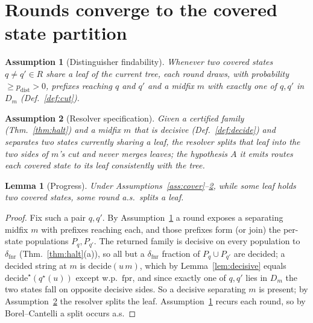 \documentclass[11pt]{article}
\newtheorem{lemma}{Lemma}
\newtheorem{assumption}{Assumption}
\newcommand{\fpr}{\mathrm{fpr}}
\newcommand{\fnr}{\mathrm{fnr}}
\begin{document}
\section{Rounds converge to the covered state partition}\label{sec:converge}

\begin{assumption}[Distinguisher findability]\label{ass:dist}
Whenever two covered states $q\ne q'\in R$ share a leaf of the current tree, each
round draws, with probability $\ge p_{\mathrm{dist}}>0$, prefixes reaching $q$ and
$q'$ and a midfix $m$ with exactly one of $q,q'$ in $D_m$ (Def.~\ref{def:cut}).
\end{assumption}

\begin{assumption}[Resolver specification]\label{ass:resolver}
Given a certified family (Thm.~\ref{thm:halt}) and a midfix $m$ that is decisive
(Def.~\ref{def:decide}) and separates two states currently sharing a leaf, the
resolver splits that leaf into the two sides of $m$'s cut and never merges leaves;
the hypothesis $A$ it emits routes each covered state to its leaf consistently with
the tree.
\end{assumption}

\begin{lemma}[Progress]\label{lem:progress}
Under Assumptions~\ref{ass:cover}--\ref{ass:resolver}, while some leaf holds two
covered states, some round a.s.\ splits a leaf.
\end{lemma}
\begin{proof}
Fix such a pair $q,q'$. By Assumption~\ref{ass:dist} a round exposes a separating
midfix $m$ with prefixes reaching each, and those prefixes form (or join) the
per-state populations $P_q,P_{q'}$. The returned family is decisive on every
population to $\delta_\fnr$ (Thm.~\ref{thm:halt}(a)), so all but a $\delta_\fnr$
fraction of $P_q\cup P_{q'}$ are decided; a decided string at $m$ is
$\mathrm{decide}(u\,m)$, which by Lemma~\ref{lem:decisive} equals
$\mathrm{decide}^\star(q^\star(u))$ except w.p.\ $\fpr$, and since exactly one of
$q,q'$ lies in $D_m$ the two states fall on opposite decisive sides. So a decisive
separating $m$ is present; by Assumption~\ref{ass:resolver} the resolver splits the
leaf. Assumption~\ref{ass:dist} recurs each round, so by Borel--Cantelli a split
occurs a.s.
\end{proof}
\end{document}
